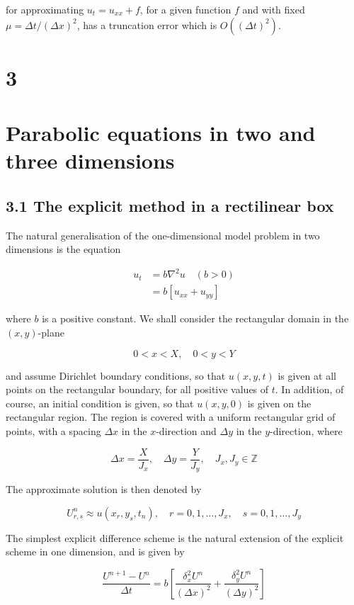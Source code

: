 \documentclass[10pt]{article}
\begin{document}
for approximating \(u_{t}=u_{x x}+f\), for a given function \(f\) and with fixed \(\mu=\Delta t /(\Delta x)^{2}\), has a truncation error which is \(O\left((\Delta t)^{2}\right)\).

\section*{3}
\section*{Parabolic equations in two and three dimensions}
\subsection*{3.1 The explicit method in a rectilinear box}
The natural generalisation of the one-dimensional model problem in two dimensions is the equation

\[
\begin{aligned}
u_{t} & =b \nabla^{2} u \quad(b>0) \\
& =b\left[u_{x x}+u_{y y}\right]
\end{aligned}
\]

where \(b\) is a positive constant. We shall consider the rectangular domain in the \((x, y)\)-plane

\[
0<x<X, \quad 0<y<Y
\]

and assume Dirichlet boundary conditions, so that \(u(x, y, t)\) is given at all points on the rectangular boundary, for all positive values of \(t\). In addition, of course, an initial condition is given, so that \(u(x, y, 0)\) is given on the rectangular region. The region is covered with a uniform rectangular grid of points, with a spacing \(\Delta x\) in the \(x\)-direction and \(\Delta y\) in the \(y\)-direction, where

\[
\Delta x=\frac{X}{J_{x}}, \quad \Delta y=\frac{Y}{J_{y}}, \quad J_{x}, J_{y} \in \mathbb{Z}
\]

The approximate solution is then denoted by

\[
U_{r, s}^{n} \approx u\left(x_{r}, y_{s}, t_{n}\right), \quad r=0,1, \ldots, J_{x}, \quad s=0,1, \ldots, J_{y}
\]

The simplest explicit difference scheme is the natural extension of the explicit scheme in one dimension, and is given by

\[
\frac{U^{n+1}-U^{n}}{\Delta t}=b\left[\frac{\delta_{x}^{2} U^{n}}{(\Delta x)^{2}}+\frac{\delta_{y}^{2} U^{n}}{(\Delta y)^{2}}\right]
\]
\end{document}
